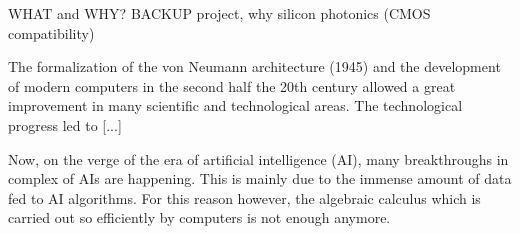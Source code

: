 WHAT and WHY?
BACKUP project, why silicon photonics (CMOS compatibility)
\vspace*{2em}

The formalization of the von Neumann architecture (1945) and the development of modern computers in the second half the 20th century allowed a great improvement in many scientific and technological areas.
The technological progress led to [...]

\vspace*{2em}
Now, on the verge of the era of artificial intelligence (AI), many breakthroughs in complex of AIs are happening.
This is mainly due to the immense amount of data fed to AI algorithms.
For this reason however, the algebraic calculus which is carried out so efficiently by computers is not enough anymore.